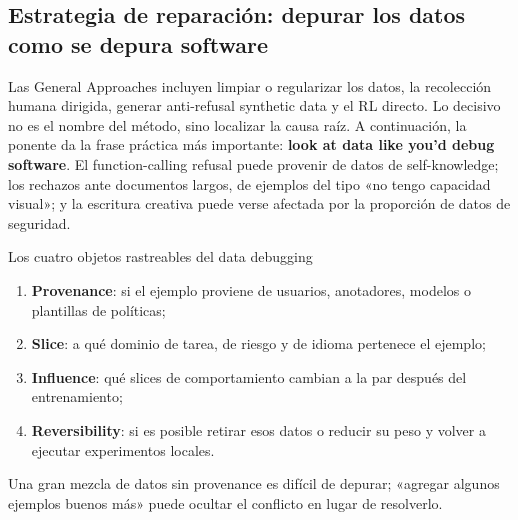 \subsection{Estrategia de reparación: depurar los datos como se depura software}

Las General Approaches incluyen limpiar o regularizar los datos, la recolección humana dirigida, generar anti-refusal synthetic data y el RL directo. Lo decisivo no es el nombre del método, sino localizar la causa raíz. A continuación, la ponente da la frase práctica más importante: \textbf{look at data like you'd debug software}. El function-calling refusal puede provenir de datos de self-knowledge; los rechazos ante documentos largos, de ejemplos del tipo «no tengo capacidad visual»; y la escritura creativa puede verse afectada por la proporción de datos de seguridad.




\begin{importantbox}{Los cuatro objetos rastreables del data debugging}
\begin{enumerate}
  \item \textbf{Provenance}: si el ejemplo proviene de usuarios, anotadores, modelos o plantillas de políticas;
  \item \textbf{Slice}: a qué dominio de tarea, de riesgo y de idioma pertenece el ejemplo;
  \item \textbf{Influence}: qué slices de comportamiento cambian a la par después del entrenamiento;
  \item \textbf{Reversibility}: si es posible retirar esos datos o reducir su peso y volver a ejecutar experimentos locales.
\end{enumerate}
Una gran mezcla de datos sin provenance es difícil de depurar; «agregar algunos ejemplos buenos más» puede ocultar el conflicto en lugar de resolverlo.
\end{importantbox}


